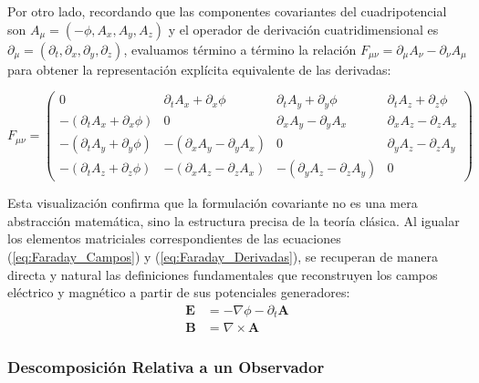 Por otro lado, recordando que las componentes covariantes del cuadripotencial son $A_\mu = (-\phi, A_x, A_y, A_z)$ y el operador de derivación cuatridimensional es $\partial_\mu = (\partial_t, \partial_x, \partial_y, \partial_z)$, evaluamos término a término la relación $F_{\mu\nu} = \partial_\mu A_\nu - \partial_\nu A_\mu$ para obtener la representación explícita equivalente de las derivadas:

\begin{equation}
\label{eq:Faraday_Derivadas}
F_{\mu\nu} = 
\begin{pmatrix}
0 & \partial_t A_x + \partial_x \phi & \partial_t A_y + \partial_y \phi & \partial_t A_z + \partial_z \phi \\
-(\partial_t A_x + \partial_x \phi) & 0 & \partial_x A_y - \partial_y A_x & \partial_x A_z - \partial_z A_x \\
-(\partial_t A_y + \partial_y \phi) & -(\partial_x A_y - \partial_y A_x) & 0 & \partial_y A_z - \partial_z A_y \\
-(\partial_t A_z + \partial_z \phi) & -(\partial_x A_z - \partial_z A_x) & -(\partial_y A_z - \partial_z A_y) & 0
\end{pmatrix}
\end{equation}

Esta visualización confirma que la formulación covariante no es una mera abstracción matemática, sino la estructura precisa de la teoría clásica. Al igualar los elementos matriciales correspondientes de las ecuaciones (\ref{eq:Faraday_Campos}) y (\ref{eq:Faraday_Derivadas}), se recuperan de manera directa y natural las definiciones fundamentales que reconstruyen los campos eléctrico y magnético a partir de sus potenciales generadores:
\begin{align}
    \mathbf{E} &= -\nabla\phi - \partial_t\mathbf{A} \label{eq:E_potencial}\\
    \mathbf{B} &= \nabla \times \mathbf{A} \label{eq:B_potencial}
\end{align}

\subsubsection{Descomposición Relativa a un Observador}

